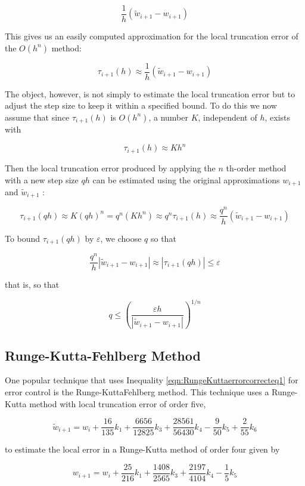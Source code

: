 $$
\frac{1}{h}\left(\tilde{w}_{i+1}-w_{i+1}\right)
$$

This gives us an easily computed approximation for the local truncation error of the $O\left(h^{n}\right)$ method:

$$
\tau_{i+1}(h) \approx \frac{1}{h}\left(\tilde{w}_{i+1}-w_{i+1}\right)
$$

The object, however, is not simply to estimate the local truncation error but to adjust the step size to keep it within a specified bound. To do this we now assume that since $\tau_{i+1}(h)$ is $O\left(h^{n}\right)$, a number $K$, independent of $h$, exists with

$$
\tau_{i+1}(h) \approx K h^{n}
$$

Then the local truncation error produced by applying the $n$ th-order method with a new step size $q h$ can be estimated using the original approximations $w_{i+1}$ and $\tilde{w}_{i+1}$ :

$$
\tau_{i+1}(q h) \approx K(q h)^{n}=q^{n}\left(K h^{n}\right) \approx q^{n} \tau_{i+1}(h) \approx \frac{q^{n}}{h}\left(\tilde{w}_{i+1}-w_{i+1}\right)
$$

To bound $\tau_{i+1}(q h)$ by $\varepsilon$, we choose $q$ so that

$$
\frac{q^{n}}{h}\left|\tilde{w}_{i+1}-w_{i+1}\right| \approx\left|\tau_{i+1}(q h)\right| \leq \varepsilon
$$

that is, so that


\begin{equation}\label{eqn:RungeKuttaerrorcorrecteq1}
q \leq\left(\frac{\varepsilon h}{\left|\tilde{w}_{i+1}-w_{i+1}\right|}\right)^{1 / n}
\end{equation}


\subsection*{Runge-Kutta-Fehlberg Method}
One popular technique that uses Inequality \ref{eqn:RungeKuttaerrorcorrecteq1} for error control is the Runge-KuttaFehlberg method. This technique uses a Runge-Kutta method with local truncation error of order five,

$$
\tilde{w}_{i+1}=w_{i}+\frac{16}{135} k_{1}+\frac{6656}{12825} k_{3}+\frac{28561}{56430} k_{4}-\frac{9}{50} k_{5}+\frac{2}{55} k_{6}
$$

to estimate the local error in a Runge-Kutta method of order four given by

$$
w_{i+1}=w_{i}+\frac{25}{216} k_{1}+\frac{1408}{2565} k_{3}+\frac{2197}{4104} k_{4}-\frac{1}{5} k_{5}
$$

